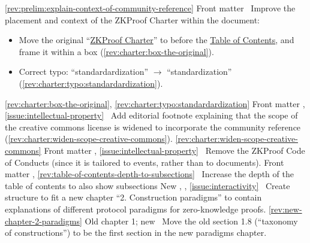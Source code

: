 \newcol \ref{rev:prelim:explain-context-of-community-reference}
\rowendL
Front matter
\newcol 
\newcol {}
\newcol \Chan\ Improve the placement and context of the ZKProof Charter within the document:
				\begin{itemize}
				\item Move the original ``\hyperref[sec:prelim:charter]{ZKProof Charter}'' to before the \hyperref[prelim:contents]{Table of Contents}, and frame it within a box (\ref{rev:charter:box-the-original}).
				\item Correct typo: ``standardardization'' $\rightarrow$ ``standardization'' (\ref{rev:charter:typo:standardardization}).
				\end{itemize}
\newcol \ref{rev:charter:box-the-original}, \ref{rev:charter:typo:standardardization}
\rowendL
Front matter
\newcol 
\newcol {}, \ref{issue:intellectual-property}
\newcol \Chan\ Add editorial footnote explaining that the scope of the creative commons license is widened to incorporate the community reference (\ref{rev:charter:widen-scope-creative-commons}).
\newcol \ref{rev:charter:widen-scope-creative-commons}
\rowendL
Front matter
\newcol 
\newcol {}, \ref{issue:intellectual-property}
\newcol \Chan\ Remove the ZKProof Code of Conducts (since it is tailored to events, rather than to documents).
\newcol 
\rowendL
Front matter
\newcol 
\newcol {}, \ref{rev:table-of-contents-depth-to-subsections}
\newcol \Chan\ Increase the depth of the table of contents to also show subsections
\newcol 
\rowendL
New 
\newcol 
\newcol {}, , \ref{issue:interactivity}
\newcol \Chan\ Create structure to fit a new chapter ``2. Construction paradigms'' to contain explanations 
	of different protocol paradigms for zero-knowledge proofs. 
\newcol \ref{rev:new-chapter-2-paradigms}
\rowendL
Old chapter 1; new 
\newcol 
\newcol {}
\newcol \Chan\ Move the old section 1.8 (``taxonomy of constructions'') 
	to be the first section in the new paradigms chapter.
